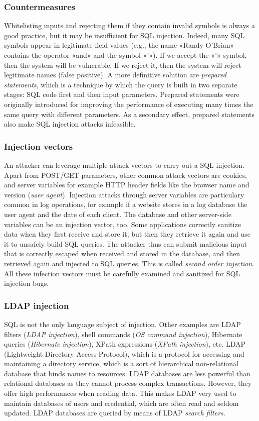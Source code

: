 \documentclass[a4paper,12pt]{article}
\begin{document}
\subsubsection{Countermeasures}
Whitelisting inputs and rejecting them if they contain invalid symbols is always a good practice, but it may be insufficient for SQL injection. Indeed, many SQL symbols appear in legitimate field values (e.g., the name «Randy O’Brian» contains the operator «and» and the symbol «'»). If we accept the «'» symbol, then the system will be vulnerable. If we reject it, then the system will reject legitimate names (false positive). A more definitive solution are \textit{prepared statements}, which is a technique by which the query is built in two separate stages: SQL code first and then input parameters. Prepared statements were originally introduced for improving the performance of executing many times the same query with different parameters. As a secondary effect, prepared statements also make SQL injection attacks infeasible.

\subsubsection{Injection vectors}
An attacker can leverage multiple attack vectors to carry out a SQL injection. Apart from POST/GET parameters, other common attack vectors are cookies, and server variables for example HTTP header fields like the browser name and version (\textit{user agent}). Injection attacks through server variables are particulary common in log operations, for example if a website stores in a log database the user agent and the date of each client. The database and other server-side variables can be an injection vector, too. Some applications correctly sanitize data when they first receive and store it, but then they retrieve it again and use it to unsafely build SQL queries. The attacker thus can submit malicious input that is correctly escaped when received and stored in the database, and then retrieved again and injected to SQL queries. This is called \textit{second order injection}. All these infection vectors must be carefully examined and sanitized for SQL injection bugs.

\subsubsection{LDAP injection}
SQL is not the only language subject of injection. Other examples are LDAP filters (\textit{LDAP injection}), shell commands (\textit{OS command injection}), Hibernate queries (\textit{Hibernate injection}), XPath expressions (\textit{XPath injection}), etc.
LDAP (Lightweight Directory Access Protocol), which is a protocol for accessing and maintaining a directory service, which is a sort of hierarchical non-relational database that binds names to resources. LDAP databases are less powerful than relational databases as they cannot process complex transactions. However, they offer high performances when reading data. This makes LDAP very used to maintain databases of users and credential, which are often read and seldom updated. LDAP databases are queried by means of LDAP \textit{search filters}.
\end{document}
